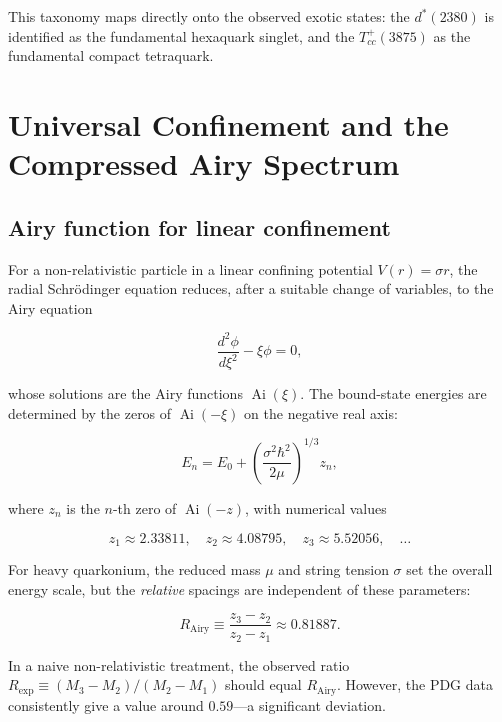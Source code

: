 \documentclass[12pt,a4paper]{article}
\theoremstyle{plain}
\theoremstyle{definition}
\theoremstyle{remark}
\begin{document}
This taxonomy maps directly onto the observed exotic states: the \(d^*(2380)\) is identified as the fundamental hexaquark singlet, and the \(T_{cc}^+(3875)\) as the fundamental compact tetraquark.

\section{Universal Confinement and the Compressed Airy Spectrum}
\label{sec:airy}

\subsection{Airy function for linear confinement}
For a non-relativistic particle in a linear confining potential \(V(r) = \sigma r\), the radial Schrödinger equation reduces, after a suitable change of variables, to the Airy equation

\begin{equation}
\frac{d^2 \phi}{d\xi^2} - \xi \phi = 0,
\label{eq:Airy}
\end{equation}

whose solutions are the Airy functions \(\operatorname{Ai}(\xi)\). The bound-state energies are determined by the zeros of \(\operatorname{Ai}(-\xi)\) on the negative real axis:

\begin{equation}
E_n = E_0 + \left(\frac{\sigma^2 \hbar^2}{2\mu}\right)^{1/3} z_n,
\label{eq:En}
\end{equation}

where \(z_n\) is the \(n\)-th zero of \(\operatorname{Ai}(-z)\), with numerical values

\begin{equation}
z_1 \approx 2.33811,\quad z_2 \approx 4.08795,\quad z_3 \approx 5.52056,\quad \dots
\label{eq:zeros}
\end{equation}

For heavy quarkonium, the reduced mass \(\mu\) and string tension \(\sigma\) set the overall energy scale, but the \emph{relative} spacings are independent of these parameters:

\begin{equation}
R_{\text{Airy}} \equiv \frac{z_3 - z_2}{z_2 - z_1} \approx 0.81887.
\label{eq:RAiry}
\end{equation}

In a naive non-relativistic treatment, the observed ratio \(R_{\text{exp}} \equiv (M_3 - M_2)/(M_2 - M_1)\) should equal \(R_{\text{Airy}}\). However, the PDG data consistently give a value around \(0.59\)---a significant deviation.
\end{document}
